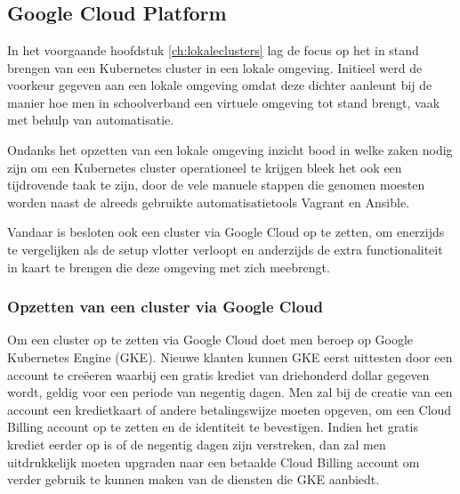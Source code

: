 
\chapter{}
\label{ch:cloudclusters}

\section{Google Cloud Platform}

In het voorgaande hoofdstuk \ref{ch:lokaleclusters} lag de focus op het in stand brengen van een Kubernetes cluster in een lokale omgeving. Initieel werd de voorkeur gegeven aan een lokale omgeving omdat deze dichter aanleunt bij de manier hoe men in schoolverband een virtuele omgeving tot stand brengt, vaak met behulp van automatisatie.

Ondanks het opzetten van een lokale omgeving inzicht bood in welke zaken nodig zijn om een Kubernetes cluster operationeel te krijgen bleek het ook een tijdrovende taak te zijn, door de vele manuele stappen die genomen moesten worden naast de alreeds gebruikte automatisatietools Vagrant en Ansible.

Vandaar is besloten ook een cluster via Google Cloud op te zetten, om enerzijds te vergelijken als de setup vlotter verloopt en anderzijds de extra functionaliteit in kaart te brengen die deze omgeving met zich meebrengt.

\subsection{Opzetten van een cluster via Google Cloud}
\label{sec:cloudclustersetup}

Om een cluster op te zetten via Google Cloud doet men beroep op Google Kubernetes Engine (GKE). Nieuwe klanten kunnen GKE eerst uittesten door een account te creëeren waarbij een gratis krediet van driehonderd dollar gegeven wordt, geldig voor een periode van negentig dagen. Men zal bij de creatie van een account een kredietkaart of andere betalingswijze moeten opgeven, om een Cloud Billing account op te zetten en de identiteit te bevestigen. Indien het gratis krediet eerder op is of de negentig dagen zijn verstreken, dan zal men uitdrukkelijk moeten upgraden naar een betaalde Cloud Billing account om verder gebruik te kunnen maken van de diensten die GKE aanbiedt. \autocite{GoogleCloud2022} 

